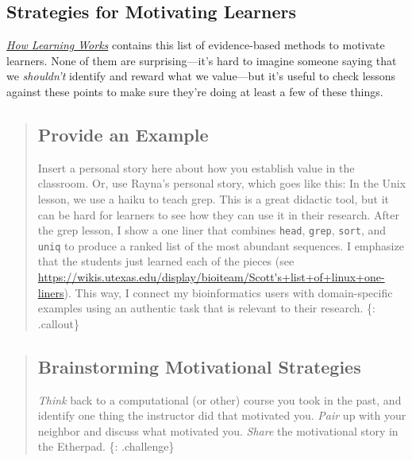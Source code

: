 \subsection{Strategies for Motivating
Learners}\label{strategies-for-motivating-learners}

\emph{\href{http://www.amazon.com/How-Learning-Works-Research-Based-Jossey-Bass/dp/0470484101/}{How
Learning Works}} contains this list of evidence-based methods to
motivate learners. None of them are surprising---it's hard to imagine
someone saying that we \emph{shouldn't} identify and reward what we
value---but it's useful to check lessons against these points to make
sure they're doing at least a few of these things.

\begin{quote}
\subsection{Provide an Example}\label{provide-an-example}

Insert a personal story here about how you establish value in the
classroom. Or, use Rayna's personal story, which goes like this: In the
Unix lesson, we use a haiku to teach grep. This is a great didactic
tool, but it can be hard for learners to see how they can use it in
their research. After the grep lesson, I show a one liner that combines
\texttt{head}, \texttt{grep}, \texttt{sort}, and \texttt{uniq} to
produce a ranked list of the most abundant sequences. I emphasize that
the students just learned each of the pieces (see
\url{https://wikis.utexas.edu/display/bioiteam/Scott's+list+of+linux+one-liners}).
This way, I connect my bioinformatics users with domain-specific
examples using an authentic task that is relevant to their research. \{:
.callout\}
\end{quote}

\begin{quote}
\subsection{Brainstorming Motivational
Strategies}\label{brainstorming-motivational-strategies}

\emph{Think} back to a computational (or other) course you took in the
past, and identify one thing the instructor did that motivated you.
\emph{Pair} up with your neighbor and discuss what motivated you.
\emph{Share} the motivational story in the Etherpad. \{: .challenge\}
\end{quote}


